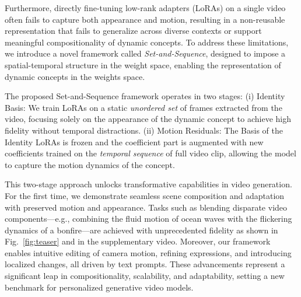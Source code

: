 Furthermore, directly fine-tuning low-rank adapters (LoRAs) on a single video often fails to capture both appearance and motion, resulting in a non-reusable representation that fails to generalize across diverse contexts or support meaningful compositionality of dynamic concepts. To address these limitations, we introduce a novel framework called \emph{Set-and-Sequence}, designed to impose a spatial-temporal structure in the weight space, enabling the representation of dynamic concepts in the weights space.

The proposed Set-and-Sequence framework operates in two stages:
(i) Identity Basis: We train LoRAs on a static \emph{unordered set} of frames extracted from the video, focusing solely on the appearance of the dynamic concept to achieve high fidelity without temporal distractions.
(ii) Motion Residuals: The Basis of the Identity LoRAs is frozen and the coefficient part is augmented with new coefficients trained on the \emph{temporal sequence} of full video clip, allowing the model to capture the motion dynamics of the concept.

This two-stage approach unlocks transformative capabilities in video generation. For the first time, we demonstrate seamless scene composition and adaptation with preserved motion and appearance. Tasks such as blending disparate video components—e.g., combining the fluid motion of ocean waves with the flickering dynamics of a bonfire—are achieved with unprecedented fidelity as shown in Fig.~\ref{fig:teaser} and in the supplementary video. Moreover, our framework enables intuitive editing of camera motion, refining expressions, and introducing localized changes, all driven by text prompts. These advancements represent a significant leap in compositionality, scalability, and adaptability, setting a new benchmark for personalized generative video models.